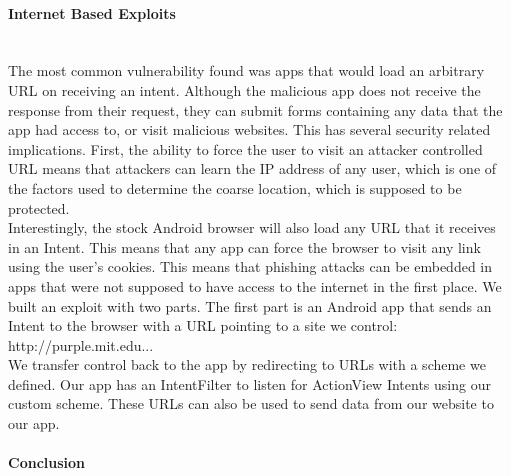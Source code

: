 \documentclass[12pt,a4paper]{article}
\begin{document}
\paragraph{Internet Based Exploits} ~\\
The most common vulnerability found was apps that would load an arbitrary URL on receiving an intent. Although the malicious app does not receive the response from their request, they can submit forms containing any data that the app had access to, or visit malicious websites. This has several security related implications. First, the ability to force the user to visit an attacker controlled URL means that attackers can learn the IP address of any user, which is one of the factors used to determine the coarse location, which is supposed to be protected.  \\
Interestingly, the stock Android browser will also load any URL that it receives in an Intent. This means that any app can force the browser to visit any link using the user's cookies. This means that phishing attacks can be embedded in apps that were not supposed to have access to the internet in the first place. 
We built an exploit with two parts. The first part is an Android app that sends an Intent to the browser with a URL pointing to a site we control: http://purple.mit.edu... \\
We transfer control back to the app by redirecting to URLs with a scheme we defined. Our app has an IntentFilter to listen for ActionView Intents using our custom scheme. These URLs can also be used to send data from our website to our app. 

\paragraph{Conclusion} ~\\

 
\end{document}
